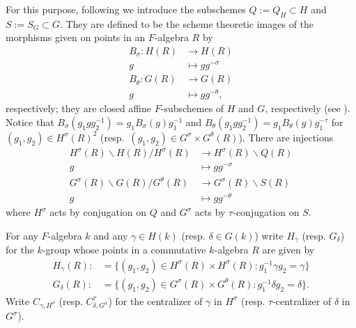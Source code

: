 \documentclass[12pt]{amsart}
\theoremstyle{remark}
\numberwithin{equation}{section}
\newcommand{\lto}{\longrightarrow}
\theoremstyle{definition}
\numberwithin{equation}{subsection}
\begin{document}
For this purpose, following \cite[Lemma 2.4]{Rich} we introduce
the subschemes $Q:=Q_H \subset H$ and $S:=S_{G} \subset G$. 
They are defined to be the scheme theoretic images of
the morphisms given on points in an $F$-algebra $R$ by
{\allowdisplaybreaks \begin{align} \label{nat-maps}
\nonumber B_{\sigma}:H(R) &\lto H(R)\\
g & \longmapsto gg^{-\sigma}\\
\nonumber B_{\theta}:G(R) & \lto G(R)\\
\nonumber g & \longmapsto gg^{-\theta},
\end{align}}
 respectively; they are closed affine $F$-subschemes of $H$ and $G$,
respectively (see \cite[\S 2.1]{HelmWang}).
Notice that $B_{\sigma}(g_1gg_2^{-1})=g_1B_{\sigma}(g)g_1^{-1}$
and $B_{\theta}(g_1gg_2^{-1})=g_1B_{\theta}(g)g_1^{-\tau}$ for $(g_1,g_2) \in H^{\sigma}(R)^2$ (resp.~$(g_1,g_2) \in G^{\sigma} \times G^{\theta}(R)$).
There are injections
{ \allowdisplaybreaks\begin{align}
\nonumber H^{\sigma}(R) \backslash H(R) /H^{\sigma}(R) &\lto H^{\sigma}(R) \backslash Q(R)\\
g & \longmapsto g g^{-\sigma}\\
\nonumber G^{\sigma}(R) \backslash G(R)/G^{\theta}(R) &\lto G^{\sigma}(R) \backslash S(R)\\
\nonumber g & \longmapsto gg^{-\theta}
\end{align}}
where $H^{\sigma}$ acts by conjugation on $Q$ and $G^{\sigma}$ acts by $\tau$-conjugation on $S$.

For any $F$-algebra $k$ and any $\gamma \in H(k)$ (resp. $\delta \in G(k)$) write
$H_{\gamma}$ (resp. $G_{\delta}$)
for the $k$-group whose points in a commutative $k$-algebra $R$
are given by
{\allowdisplaybreaks \begin{align}
H_{\gamma}(R):&=\{(g_1,g_2)\in H^{\sigma}(R) \times H^{\sigma}(R):g_1^{-1}\gamma
g_2=\gamma\}\\
\nonumber G_{\delta}(R):&=\{(g_1,g_2) \in G^{\sigma}(R) \times G^{\theta}(R)
:g_1^{-1}\delta g_2=\delta\}.
\end{align}}Write $C_{\gamma,H^{\sigma}}$ (resp. $C_{\delta,G^{\sigma}}^{\tau}$)
for the centralizer of $\gamma$ in $H^{\sigma}$ (resp. $\tau$-centralizer of $\delta$ in
$G^{\sigma}$).
\end{document}
